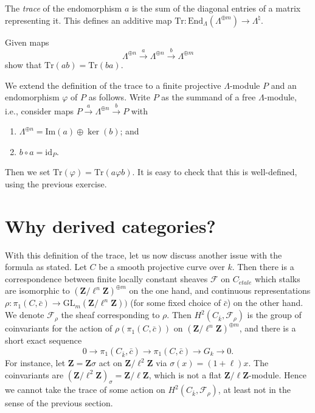 \begin{definition}
\label{definition-trace}
The {\it trace} of the endomorphism $a$ is the sum of the diagonal entries of
a matrix representing it. This defines an additive map $\text{Tr} :
\text{End}_\Lambda(\Lambda^{\oplus m}) \to \Lambda^\natural$.
\end{definition}

\begin{exercise}
\label{exercise-trace-is-trace}
Given maps
$$
\Lambda^{\oplus n} \xrightarrow{a}
\Lambda^{\oplus n} \xrightarrow{b}
\Lambda^{\oplus m}
$$
show that $\text{Tr}(ab) = \text{Tr}(ba)$.
\end{exercise}

\noindent
We extend the definition of the trace to a finite projective $\Lambda$-module
$P$ and an endomorphism $\varphi$ of $P$ as follows. Write $P$ as the summand
of a free $\Lambda$-module, i.e., consider maps $P \xrightarrow{a}
\Lambda^{\oplus n} \xrightarrow{b} P$ with
\begin{enumerate}
\item
$\Lambda^{\oplus n} = \text{Im}(a) \oplus \ker(b)$; and
\item
$b\circ a = \text{id}_P$.
\end{enumerate}
Then we set $\text{Tr}(\varphi) = \text{Tr}(a\varphi b)$. It is easy to check
that this is well-defined, using the previous exercise.








\section{Why derived categories?}
\label{section-derived-categories-why}

\noindent
With this definition of the trace, let us now discuss another issue with the
formula as stated. Let $C$ be a smooth projective curve over $k$. Then there is
a correspondence between finite locally constant sheaves $\mathcal{F}$ on
$C_{\acute{e}tale}$ which stalks are isomorphic to
${(\mathbf{Z}/\ell^n\mathbf{Z})}^{\oplus m}$ on the one hand, and continuous
representations $\rho : \pi_1 (C, \bar c) \to
\text{GL}_m(\mathbf{Z}/\ell^n\mathbf{Z}))$ (for some fixed choice of $\bar c$)
on the other hand. We denote $\mathcal{F}_\rho$ the sheaf corresponding to
$\rho$. Then $H^2 (C_{\bar k}, \mathcal{F}_\rho)$ is the group of coinvariants
for the action of $\rho(\pi_1 (C, \bar c))$ on
${(\mathbf{Z}/\ell^n\mathbf{Z})}^{\oplus m}$, and there is a short exact
sequence
$$
0 \longrightarrow \pi_1 (C_{\bar k}, \bar c) \longrightarrow \pi_1 (C, \bar c)
\longrightarrow G_k \longrightarrow 0.
$$
For instance, let $\mathbf{Z} = \mathbf{Z} \sigma$ act on
$\mathbf{Z}/\ell^2\mathbf{Z}$ via $\sigma(x) = (1+\ell) x$. The coinvariants
are $(\mathbf{Z}/\ell^2\mathbf{Z})_{\sigma} = \mathbf{Z}/\ell\mathbf{Z}$, which
is not a flat $\mathbf{Z}/\ell\mathbf{Z}$-module. Hence we cannot take the
trace of some action on $H^2(C_{\bar k}, \mathcal{F}_\rho)$, at least not in
the sense of the previous section.


